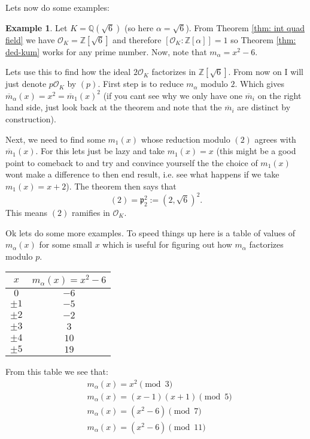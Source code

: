 \documentclass[11pt,a4paper]{report}
\theoremstyle{plain}
\theoremstyle{definition}
\newtheorem{exmp}[subsection]{Example}
\theoremstyle{definition}
\newcommand{\ZZ}{\mathbb{Z}}
\def\QQ{\mathbb{Q}}
\def\gothp{\mathfrak{p}}
\def \a{\alpha}
\def \OO {\mathcal{O}}
\def \ov{\overline}
\begin{document}
	
	Lets now do some examples:
	
	
	\begin{exmp}
		Let $K=\QQ(\sqrt{6})$ (so here $\a=\sqrt{6}$). From Theorem \ref{thm: int quad field} we have $\OO_K=\ZZ[\sqrt{6}]$ and therefore $[\OO_K:\ZZ[\a]]=1$ so Theorem \ref{thm: ded-kum} works for any prime number.  Now, note that $m_\a=x^2-6$. 
		
		Lets use this to find how the ideal $2\OO_K$ factorizes in $\ZZ[\sqrt{6}]$. From now on I will just denote $p\OO_K$ by $(p)$. First step is to reduce $m_\a$ modulo $2$. Which gives $\ov{m}_\a(x)=x^2=\ov{m}_1(x)^2$ (if you cant see why we only have one $\ov{m}_i$ on the right hand side, just look back at the theorem and note that the $\ov{m}_i$ are distinct by construction). 
		
		Next, we need to find some $m_1(x)$ whose reduction modulo $(2)$ agrees with $\ov{m}_1(x)$. For this lets just be lazy and take $m_1(x)=x$ (this might be a good point to comeback to and try and convince yourself the the choice of $m_1(x)$ wont make a difference to then end result, i.e. see what happens if we take $m_1(x)=x+2$). The theorem then says that \[(2)=\gothp_2^2:=(2,\sqrt{6})^2.\] This means $(2)$ ramifies in $\OO_K$.
		
		Ok lets do some more examples. To speed things up here is a table of values of $m_\a(x)$ for some small $x$ which is useful for figuring out how $m_\a$ factorizes modulo $p$.
		\begin{center}
			
			\begin{tabular}{ | c | c | }
				\hline
				
				$x$ &   $m_\a(x)=x^2-6$  \\ \hline
				$0$ & $-6$ \\  \hline
				$\pm 1$ & $-5$ \\  \hline
				$\pm 2$ & $-2$ \\  \hline
				$\pm 3$ & $3$ \\  \hline	
				$\pm 4$ & $10$ \\  \hline
				$\pm 5$ & $19$ \\  \hline	
			\end{tabular}			
		\end{center}
		
		From this table we see that:
		\begin{align*}
			&m_\a(x)=x^2 \pmod 3\\
			&m_\a(x)=(x-1)(x+1) \pmod 5\\
			&m_\a(x)=(x^2-6) \pmod 7\\
			&m_\a(x)=(x^2-6) \pmod {11}\\
		\end{align*}
		

\end{exmp}
\end{document}
